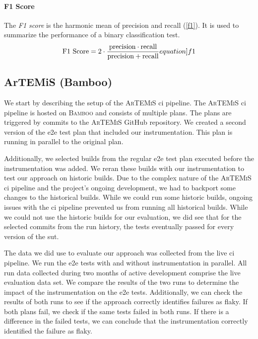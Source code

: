 \paragraph{F1 Score} The \emph{F1 score} is the harmonic mean of precision and recall (\ref{f1}).
It is used to summarize the performance of a binary classification test.
\begin{equation}
	\text{F1 Score} = 2 \cdot \frac{\text{precision} \cdot \text{recall}}{\text{precision} + \text{recall}}
	\label[equation]{f1}
\end{equation}

\subsection{ArTEMiS (Bamboo)}
We start by describing the setup of the \textsc{ArTEMiS} \ac{ci} pipeline.
The \textsc{ArTEMiS} \ac{ci} pipeline is hosted on \textsc{Bamboo} \autocite{atlassian_bamboo_nodate} and consists of multiple plans.
The plans are triggered by commits to the \textsc{ArTEMiS} GitHub repository.
We created a second version of the \ac{e2e} test plan that included our instrumentation.
This plan is running in parallel to the original plan.

Additionally, we selected builds from the regular \ac{e2e} test plan executed before the instrumentation was added.
We reran these builds with our instrumentation to test our approach on historic builds.
Due to the complex nature of the \textsc{ArTEMiS} \ac{ci} pipeline and the project's ongoing development, we had to backport some changes to the historical builds.
While we could run some historic builds, ongoing issues with the \ac{ci} pipeline prevented us from running all historical builds.
While we could not use the historic builds for our evaluation, we did see that for the selected commits from the run history, the tests eventually passed for every version of the \ac{sut}.

The data we did use to evaluate our approach was collected from the live \ac{ci} pipeline.
We run the \ac{e2e} tests with and without instrumentation in parallel.
All run data collected during two months of active development comprise the live evaluation data set.
We compare the results of the two runs to determine the impact of the instrumentation on the \ac{e2e} tests.
Additionally, we can check the results of both runs to see if the approach correctly identifies failures as flaky.
If both plans fail, we check if the same tests failed in both runs.
If there is a difference in the failed tests, we can conclude that the instrumentation correctly identified the failure as flaky.

